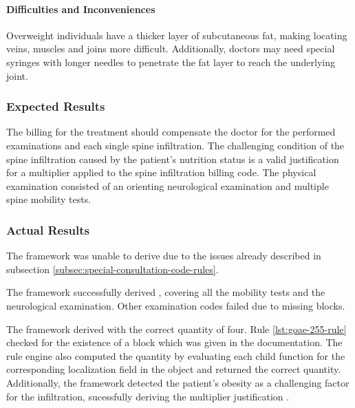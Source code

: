 \paragraph{Difficulties and Inconveniences}
Overweight individuals have a thicker layer of subcutaneous fat, making locating veins, muscles and joins more difficult.
Additionally, doctors may need special syringes with longer needles to penetrate the fat layer to reach the underlying joint.


\subsubsection{Expected Results}
The billing for the treatment should compensate the doctor for the performed examinations and each single spine infiltration.
The challenging condition of the spine infiltration caused by the patient's nutrition status is a valid justification for a multiplier applied to the spine infiltration billing code.
The physical examination consisted of an orienting neurological examination and multiple spine mobility tests.


\subsubsection{Actual Results}
The framework was unable to derive  due to the issues already described in subsection \ref{subsec:special-consultation-code-rules}.

The framework successfully derived , covering all the mobility tests and the neurological examination.
Other examination codes failed due to missing blocks.

The framework derived  with the correct quantity of four.
Rule \ref{lst:goae-255-rule} checked for the existence of a  block which was given in the documentation.
The rule engine also computed the quantity by evaluating each child function for the corresponding localization field in the  object and returned the correct quantity.
Additionally, the framework detected the patient's obesity as a challenging factor for the infiltration,
sucessfully deriving the multiplier justification \addref.







